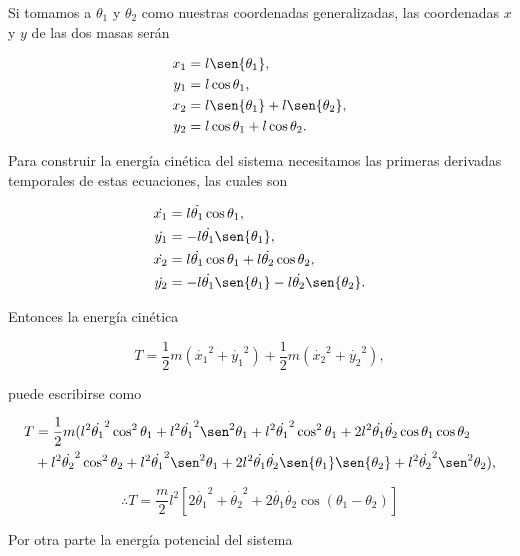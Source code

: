 \documentclass[a4paper,10pt]{article}
\numberwithin{equation}{section}
\begin{document}
Si tomamos a $\theta_1$ y $\theta_2$ como nuestras coordenadas generalizadas, las 
coordenadas $x$ y $y$ de las dos masas serán

\begin{align}
 x_1 &= l\sen{\theta_1}, \\
 y_1 &= l\cos{\theta_1}, \\
 x_2 &= l\sen{\theta_1} + l\sen{\theta_2}, \\
 y_2 &= l\cos{\theta_1} + l\cos{\theta_2}.
\end{align}

Para construir la energía cinética del sistema necesitamos las primeras derivadas
temporales de estas ecuaciones, las cuales son

\begin{align}
 \dot{x_1} &= l\dot{\theta_1}\cos{\theta_1}, \\
 \dot{y_1} &= - l\dot{\theta_1}\sen{\theta_1}, \\
 \dot{x_2} &=  l\dot{\theta_1}\cos{\theta_1} + l\dot{\theta_2}\cos{\theta_2}, \\
 \dot{y_2} &= - l\dot{\theta_1}\sen{\theta_1} - l\dot{\theta_2}\sen{\theta_2}.
\end{align}

Entonces la energía cinética

\begin{equation}
 T = \frac{1}{2}m(\dot{x_1}^2 + \dot{y_1}^2) +  \frac{1}{2}m(\dot{x_2}^2 + \dot{y_2}^2),
\end{equation}

puede escribirse como 

\begin{align}
 T &= \frac{1}{2}m(l^2\dot{\theta_1}^2\cos^2{\theta_1} + l^2\dot{\theta_1}^2\sen^2{\theta_1} 
 + l^2\dot{\theta_1}^2\cos^2{\theta_1} + 2l^2\dot{\theta_1}\dot{\theta_2}\cos{\theta_1}\cos{\theta_2} \\
 &+ l^2\dot{\theta_2}^2\cos^2{\theta_2} + l^2\dot{\theta_1}^2\sen^2{\theta_1} + 
 2l^2\dot{\theta_1}\dot{\theta_2}\sen{\theta_1}\sen{\theta_2} + l^2\dot{\theta_2}^2\sen^2{\theta_2}),
\end{align}

\begin{equation}
 \therefore T = \frac{m}{2}l^2\left[2\dot{\theta_1}^2 + \dot{\theta_2}^2 
 + 2\dot{\theta_1}\dot{\theta_2}\cos{(\theta_1 - \theta_2)}\right]
\end{equation}

Por otra parte la energía potencial del sistema 
\end{document}
